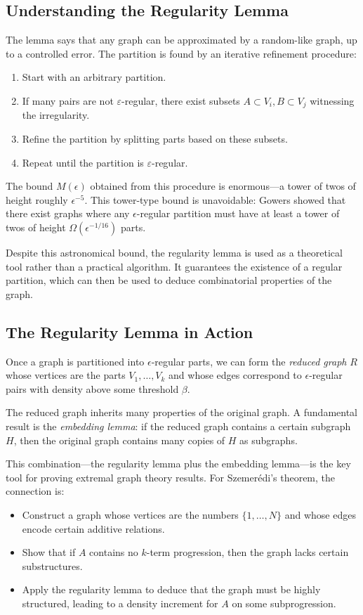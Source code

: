 \subsection{Understanding the Regularity Lemma}

The lemma says that any graph can be approximated by a random-like graph, up to a controlled error. The partition is found by an iterative refinement procedure:
\begin{enumerate}
\item Start with an arbitrary partition.
\item If many pairs are not $\varepsilon$-regular, there exist subsets $A \subset V_i, B \subset V_j$ witnessing the irregularity.
\item Refine the partition by splitting parts based on these subsets.
\item Repeat until the partition is $\varepsilon$-regular.
\end{enumerate}

The bound $M(\epsilon)$ obtained from this procedure is enormous---a tower of twos of height roughly $\epsilon^{-5}$. This tower-type bound is unavoidable: Gowers showed that there exist graphs where any $\epsilon$-regular partition must have at least a tower of twos of height $\Omega(\epsilon^{-1/16})$ parts.

Despite this astronomical bound, the regularity lemma is used as a theoretical tool rather than a practical algorithm. It guarantees the existence of a regular partition, which can then be used to deduce combinatorial properties of the graph.

\subsection{The Regularity Lemma in Action}

Once a graph is partitioned into $\epsilon$-regular parts, we can form the \emph{reduced graph} $R$ whose vertices are the parts $V_1,\ldots,V_k$ and whose edges correspond to $\epsilon$-regular pairs with density above some threshold $\beta$.

The reduced graph inherits many properties of the original graph. A fundamental result is the \emph{embedding lemma}: if the reduced graph contains a certain subgraph $H$, then the original graph contains many copies of $H$ as subgraphs.

This combination---the regularity lemma plus the embedding lemma---is the key tool for proving extremal graph theory results. For Szemer\'edi's theorem, the connection is:
\begin{itemize}
\item Construct a graph whose vertices are the numbers $\{1,\ldots,N\}$ and whose edges encode certain additive relations.
\item Show that if $A$ contains no $k$-term progression, then the graph lacks certain substructures.
\item Apply the regularity lemma to deduce that the graph must be highly structured, leading to a density increment for $A$ on some subprogression.
\end{itemize}

